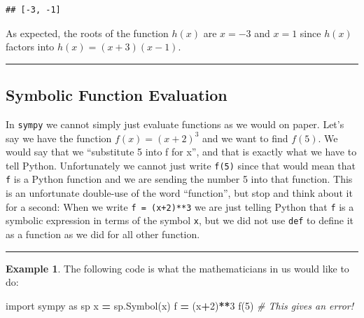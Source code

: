 \documentclass[
]{book}
\newenvironment{Shaded}{\begin{snugshade}}{\end{snugshade}}
\newcommand{\CommentTok}[1]{\textcolor[rgb]{0.56,0.35,0.01}{\textit{#1}}}
\newcommand{\DecValTok}[1]{\textcolor[rgb]{0.00,0.00,0.81}{#1}}
\newcommand{\ImportTok}[1]{#1}
\newcommand{\NormalTok}[1]{#1}
\newcommand{\OperatorTok}[1]{\textcolor[rgb]{0.81,0.36,0.00}{\textbf{#1}}}
\newcommand{\StringTok}[1]{\textcolor[rgb]{0.31,0.60,0.02}{#1}}
\theoremstyle{definition}
\theoremstyle{definition}
\newtheorem{example}{Example}[chapter]
\theoremstyle{definition}
\theoremstyle{remark}
\begin{document}
\begin{verbatim}
## [-3, -1]
\end{verbatim}

As expected, the roots of the function \(h(x)\) are \(x=-3\) and \(x=1\) since \(h(x)\) factors into \(h(x) = (x+3)(x-1)\).

\begin{center}\rule{0.5\linewidth}{0.5pt}\end{center}

\hypertarget{symbolic-function-evaluation}{%
\subsection{Symbolic Function Evaluation}\label{symbolic-function-evaluation}}

In \texttt{sympy} we cannot simply just evaluate functions as we would on paper. Let's say we have the function \(f(x)= (x+2)^3\) and we want to find \(f(5)\). We would say that we ``substitute 5 into f for x'', and that is exactly what we have to tell Python. Unfortunately we cannot just write \texttt{f(5)} since that would mean that \texttt{f} is a Python function and we are sending the number 5 into that function. This is an unfortunate double-use of the word ``function'', but stop and think about it for a second: When we write \texttt{f\ =\ (x+2)**3} we are just telling Python that \texttt{f} is a symbolic expression in terms of the symbol \texttt{x}, but we did not use \texttt{def} to define it as a function as we did for all other function.

\begin{center}\rule{0.5\linewidth}{0.5pt}\end{center}

\begin{example}
\protect\hypertarget{exm:unnamed-chunk-791}{}{\label{exm:unnamed-chunk-791} }The following code is what the mathematicians in us would like to do:
\end{example}

\begin{Shaded}
\begin{Highlighting}[]
\ImportTok{import}\NormalTok{ sympy }\ImportTok{as}\NormalTok{ sp}
\NormalTok{x }\OperatorTok{=}\NormalTok{ sp.Symbol(}\StringTok{\textquotesingle{}x\textquotesingle{}}\NormalTok{)}
\NormalTok{f }\OperatorTok{=}\NormalTok{ (x}\OperatorTok{+}\DecValTok{2}\NormalTok{)}\OperatorTok{**}\DecValTok{3}
\NormalTok{f(}\DecValTok{5}\NormalTok{) }\CommentTok{\# This gives an error!}
\end{Highlighting}
\end{Shaded}
\end{document}
